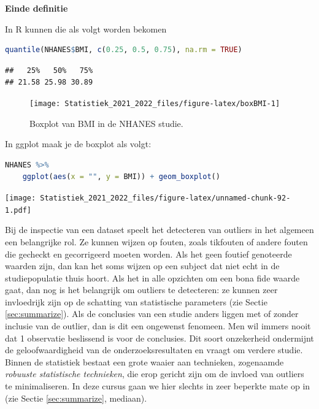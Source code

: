 \documentclass[
  12pt,dutch,coursenotes]{book}
\theoremstyle{definition}
\theoremstyle{definition}
\theoremstyle{definition}
\theoremstyle{definition}
\theoremstyle{remark}
\begin{document}
\textbf{Einde definitie}

In R kunnen die als volgt worden bekomen

\begin{lstlisting}[language=R]
quantile(NHANES$BMI, c(0.25, 0.5, 0.75), na.rm = TRUE)
\end{lstlisting}

\begin{lstlisting}
##   25%   50%   75% 
## 21.58 25.98 30.89
\end{lstlisting}

\begin{figure}

{\centering \texttt{[image: Statistiek\_2021\_2022\_files/figure-latex/boxBMI-1]} 

}

\caption{Boxplot van BMI in de NHANES studie.}\label{fig:boxBMI}
\end{figure}

In ggplot maak je de boxplot als volgt:

\begin{lstlisting}[language=R]
NHANES %>%
    ggplot(aes(x = "", y = BMI)) + geom_boxplot()
\end{lstlisting}

\texttt{[image: Statistiek\_2021\_2022\_files/figure-latex/unnamed-chunk-92-1.pdf]}

Bij de inspectie van een dataset speelt het detecteren van outliers in het
algemeen een belangrijke rol. Ze kunnen wijzen op fouten, zoals tikfouten of
andere fouten die gecheckt en gecorrigeerd moeten worden. Als het geen
foutief genoteerde waarden zijn, dan kan het soms wijzen op een subject dat niet
echt in de studiepopulatie thuis hoort. Als het in
alle opzichten om een bona fide waarde gaat, dan nog is het belangrijk om
outliers te detecteren: ze kunnen zeer invloedrijk zijn op de schatting van
statistische parameters (zie Sectie \ref{sec:summarize}). Als de conclusies
van een studie anders liggen met of zonder inclusie van de outlier, dan is
dit een ongewenst fenomeen. Men wil immers nooit dat 1 observatie beslissend
is voor de conclusies. Dit soort onzekerheid ondermijnt de geloofwaardigheid
van de onderzoeksresultaten en vraagt om verdere studie. Binnen de
statistiek bestaat een grote waaier aan technieken, zogenaamde
\emph{robuuste statistische technieken}, die erop gericht zijn om de invloed van
outliers te minimaliseren. In deze cursus gaan we hier slechts in zeer
beperkte mate op in (zie Sectie \ref{sec:summarize}, mediaan).
\end{document}
